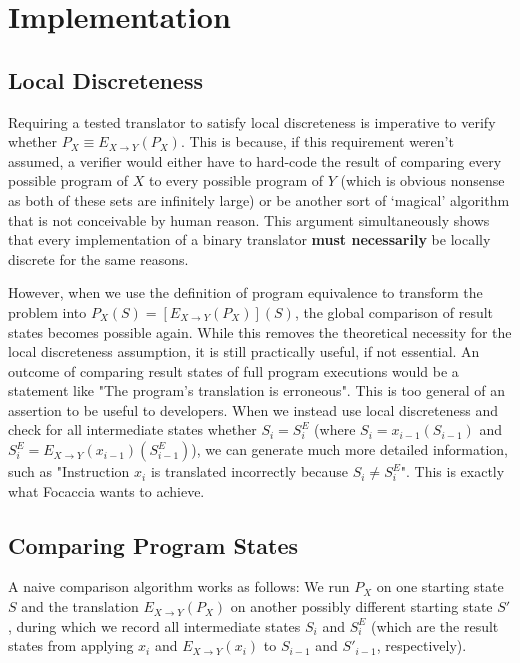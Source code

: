 \chapter{Implementation}\label{chapter:implementation}

\section{Local Discreteness}\label{sec:impl:local_discreteness}

Requiring a tested translator to satisfy local discreteness is imperative to verify whether $P_X \equiv E_{X \rightarrow
Y}(P_X)$. This is because, if this requirement weren't assumed, a verifier would either have to hard-code the result of
comparing every possible program of $X$ to every possible program of $Y$ (which is obvious nonsense as both of these
sets are infinitely large) or be another sort of `magical' algorithm that is not conceivable by human reason. This
argument simultaneously shows that every implementation of a binary translator \textbf{must necessarily} be locally
discrete for the same reasons.

However, when we use the definition of program equivalence to transform the problem into $P_X(S) = [E_{X \rightarrow
Y}(P_X)](S)$, the global comparison of result states becomes possible again. While this removes the theoretical
necessity for the local discreteness assumption, it is still practically useful, if not essential. An outcome of
comparing result states of full program executions would be a statement like "The program's translation is erroneous".
This is too general of an assertion to be useful to developers. When we instead use local discreteness and check for all
intermediate states whether $S_i = S^E_i$ (where $S_i = x_{i-1}(S_{i-1})$ and $S^E_i = E_{X \rightarrow
Y}(x_{i-1})(S^E_{i-1})$), we can generate much more detailed information, such as "Instruction $x_i$ is translated
incorrectly because $S_i \neq S^E_i$". This is exactly what Focaccia wants to achieve.

\section{Comparing Program States}\label{sec:impl:comparison}

A naive comparison algorithm works as follows: We run $P_X$ on one starting state $S$ and the translation $E_{X
\rightarrow Y}(P_X)$ on another possibly different starting state $S'$, during which we record all intermediate states
$S_i$ and $S^E_i$ (which are the result states from applying $x_i$ and $E_{X \rightarrow Y}(x_i)$ to $S_{i-1}$ and
$S'_{i-1}$, respectively).

